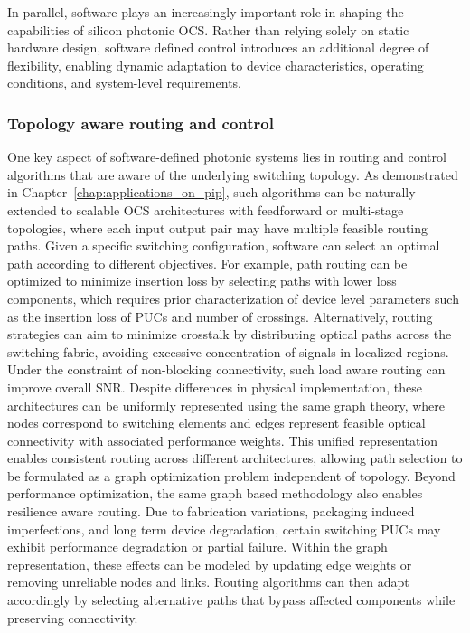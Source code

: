 In parallel, software plays an increasingly important role in shaping the capabilities of silicon photonic OCS.
Rather than relying solely on static hardware design, software defined control introduces an additional degree of flexibility, enabling dynamic adaptation to device characteristics, operating conditions, and system-level requirements.

\subsubsection{Topology aware routing and control} \label{subsec:software_control}
One key aspect of software-defined photonic systems lies in routing and control algorithms that are aware of the underlying switching topology.
As demonstrated in Chapter~\ref{chap:applications_on_pip}, such algorithms can be naturally extended to scalable OCS architectures with feedforward or multi-stage topologies, where each input output pair may have multiple feasible routing paths.
Given a specific switching configuration, software can select an optimal path according to different objectives.
For example, path routing can be optimized to minimize insertion loss by selecting paths with lower loss components, which requires prior characterization of device level parameters such as the insertion loss of PUCs and number of crossings.
Alternatively, routing strategies can aim to minimize crosstalk by distributing optical paths across the switching fabric, avoiding excessive concentration of signals in localized regions.
Under the constraint of non-blocking connectivity, such load aware routing can improve overall SNR.
Despite differences in physical implementation, these architectures can be uniformly represented using the same graph theory, where nodes correspond to switching elements and edges represent feasible optical connectivity with associated performance weights.
This unified representation enables consistent routing across different architectures, allowing path selection to be formulated as a graph optimization problem independent of topology.
Beyond performance optimization, the same graph based methodology also enables resilience aware routing.
Due to fabrication variations, packaging induced imperfections, and long term device degradation, certain switching PUCs may exhibit performance degradation or partial failure.
Within the graph representation, these effects can be modeled by updating edge weights or removing unreliable nodes and links.
Routing algorithms can then adapt accordingly by selecting alternative paths that bypass affected components while preserving connectivity.

